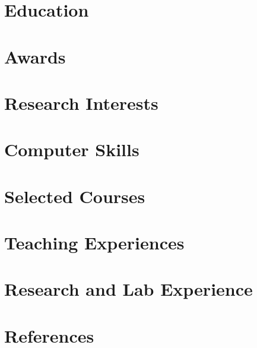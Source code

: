 \documentclass[10pt]{article}
\begin{document}
  
  \vspace{-20pt}
  \begin{paracol}{2}
    \section{Education}
      
    \section{Awards}
      
    \section{Research Interests}
      
    \section{Computer Skills}
      
    \section{Selected Courses}
      
    \section{Teaching Experiences}
      
    \switchcolumn
    \section{Research and Lab Experience}
      
    \section{References}
      
  \end{paracol}
\end{document}
